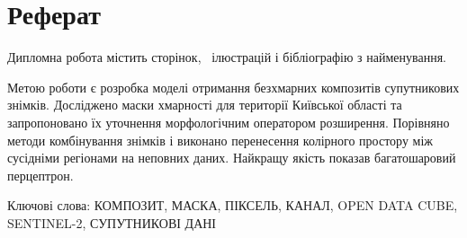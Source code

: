 \chapter*{Реферат}

Дипломна робота містить \pageref{LastPage} сторінок, %
\totalfigures\ ілюстрацій і
бібліографію з  найменування.

Метою роботи є розробка моделі отримання %
безхмарних композитів супутникових знімків.
Досліджено маски хмарності для території %
Київської області та запропоновано їх %
уточнення
морфологічним оператором розширення.  %
Порівняно методи комбінування знімків і %
виконано
перенесення колірного простору між сусідніми %
регіонами на неповних даних.  Найкращу
якість показав багатошаровий перцептрон.

Ключові слова: \MakeUppercase{композит, маска, піксель, %
канал, Open Data Cube,
Sentinel-2, супутникові дані}
